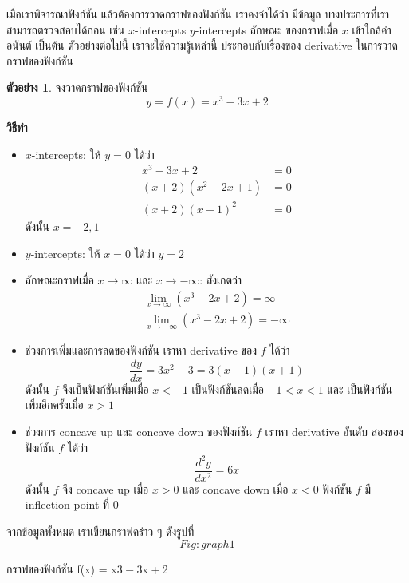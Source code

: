 \documentclass[
]{book}
\theoremstyle{definition}
\theoremstyle{definition}
\newtheorem{example}{ตัวอย่าง}[chapter]
\theoremstyle{definition}
\theoremstyle{definition}
\theoremstyle{remark}
\begin{document}
เมื่อเราพิจารณาฟังก์ชัน แล้วต้องการวาดกราฟของฟังก์ชัน เราคงจำได้ว่า มีข้อมูล
บางประการที่เราสามารถตรวจสอบได้ก่อน เช่น \(x\)-intercepts \(y\)-intercepts ลักษณะ
ของกราฟเมื่อ \(x\) เข้าใกล้ค่าอนันต์ เป็นต้น ตัวอย่างต่อไปนี้ เราจะใช้ความรู้เหล่านี้
ประกอบกับเรื่องของ derivative ในการวาดกราฟของฟังก์ชัน

\begin{example}
จงวาดกราฟของฟังก์ชัน \[y = f(x) =  x^3-3x+2\]
\end{example}

\textbf{วิธีทำ}

\begin{itemize}
\item
  \(x\)-intercepts: ให้ \(y=0\) ได้ว่า \begin{equation}   \begin{aligned}
      x^3-3x+2 &= 0 \\
      (x+2)(x^2-2x+1) &= 0 \\
      (x+2)(x-1)^2 &= 0
    \end{aligned} \end{equation} ดังนั้น \(x=-2, 1\)
\item
  \(y\)-intercepts: ให้ \(x=0\) ได้ว่า \(y=2\)
\item
  ลักษณะกราฟเมื่อ \(x \to \infty\) และ \(x \to -\infty\): สังเกตว่า
  \begin{equation}   \begin{aligned}
      \lim_{x\to \infty} (x^3-2x+2) = \infty \\
      \lim_{x\to -\infty} (x^3-2x+2) = -\infty
    \end{aligned} \end{equation}
\item
  ช่วงการเพิ่มและการลดของฟังก์ชัน เราหา derivative ของ \(f\) ได้ว่า
  \[\frac{dy}{dx} = 3x^2-3 = 3(x-1)(x+1)\] ดังนั้น \(f\) จึงเป็นฟังก์ชันเพิ่มเมื่อ
  \(x < -1\) เป็นฟังก์ชันลดเมื่อ \(-1 < x < 1\) และ เป็นฟังก์ชันเพิ่มอีกครั้งเมื่อ \(x>1\)
\item
  ช่วงการ concave up และ concave down ของฟังก์ชัน \(f\) เราหา derivative
  อันดับ สองของฟังก์ชัน \(f\) ได้ว่า \[\frac{d^2y}{dx^2} = 6x\] ดังนั้น \(f\) จึง
  concave up เมื่อ \(x>0\) และ concave down เมื่อ \(x<0\) ฟังก์ชัน \(f\) มี
  inflection point ที่ \(0\)
\end{itemize}

จากข้อมูลทั้งหมด เราเขียนกราฟคร่าว ๆ
ดังรูปที่~\hyperref[Fig:graph1]{\[Fig:graph1\]}

กราฟของฟังก์ชัน {f(x) = x3 − 3x + 2}
\end{document}
